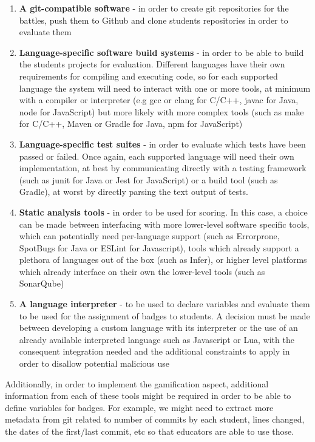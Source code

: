 \begin{enumerate}
    \item \textbf{A git-compatible software} {-} in order to create git repositories for
          the battles, push them to Github and clone students repositories in order to evaluate
          them
    \item \textbf{Language-specific software build systems} {-} in order to be able to build
          the students projects for evaluation. Different languages have their own
          requirements for compiling and executing code, so for each supported language
          the system will need to interact with one or more tools, at minimum with a
          compiler or interpreter (e.g gcc or clang for C/C++, javac for Java, node for
          JavaScript) but more likely with more complex tools (such as make for C/C++,
          Maven or Gradle for Java, npm for JavaScript)
    \item \textbf{Language-specific test suites} {-} in order to evaluate which
          tests have been passed or failed. Once again, each supported language
          will need their own implementation, at best by communicating directly
          with a testing framework (such as junit for Java or Jest for JavaScript)
          or a build tool (such as Gradle), at worst by directly parsing the text
          output of tests.
    \item \textbf{Static analysis tools} {-} in order to be used for scoring. In this
          case, a choice can be made between interfacing with more lower-level software
          specific tools, which can potentially need per-language support (such as
          Errorprone, SpotBugs for Java or ESLint for Javascript), tools which already
          support a plethora of languages out of the box (such as Infer), or higher level
          platforms which already interface on their own the lower-level tools (such as
          SonarQube)
    \item \textbf{A language interpreter} {-} to be used to declare variables and evaluate
          them to be used for the assignment of badges to students. A decision must be made
          between developing a custom language with its interpreter or the use of an already
          available interpreted language such as Javascript or Lua, with the consequent
          integration needed and the additional constraints to apply in order to disallow
          potential malicious use
\end{enumerate}
Additionally, in order to implement the gamification aspect, additional information
from each of these tools might be required in order to be able to define variables
for badges. For example, we might need to extract more metadata from git
related to number of commits by each student, lines changed, the dates of
the first/last commit, etc so that educators are able to use those.

